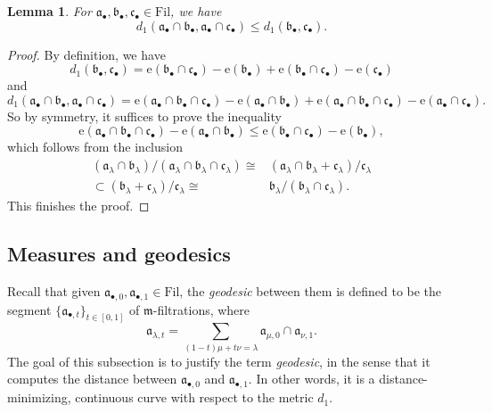 \documentclass[11pt, leqno]{amsart}%
\theoremstyle{plain}
\newtheorem{lemma}[theorem]{Lemma}
\theoremstyle{definition}
\theoremstyle{remark}
\newcommand{\fa}{\mathfrak{a}}
\newcommand{\fb}{\mathfrak{b}}
\newcommand{\fc}{\mathfrak{c}}
\newcommand{\fm}{\mathfrak{m}}
\newcommand{\e}{\mathrm{e}}
\newcommand{\Fil}{\mathrm{Fil}}
\numberwithin{equation}{section}
\begin{document}
\begin{lemma}\label{lem:rooftop}
    For $\fa_\bullet,\fb_\bullet,\fc_\bullet\in\Fil$, we have
    \begin{equation}\label{eqn:strong triangle}
        d_1(\fa_\bullet\cap \fb_\bullet,\fa_\bullet\cap\fc_\bullet)\le d_1(\fb_\bullet,\fc_\bullet).
    \end{equation}
\end{lemma}

\begin{proof}
    By definition, we have
    \[
        d_1(\fb_\bullet,\fc_\bullet)= \e(\fb_\bullet\cap \fc_\bullet)-\e(\fb_\bullet)+
        \e(\fb_\bullet\cap \fc_\bullet)-\e(\fc_\bullet)
    \]
    and
    \[
        d_1(\fa_\bullet\cap\fb_\bullet,
        \fa_\bullet\cap\fc_\bullet)=
        \e(\fa_\bullet\cap\fb_\bullet\cap \fc_\bullet)-\e(\fa_\bullet\cap\fb_\bullet)+\e(\fa_\bullet\cap\fb_\bullet\cap \fc_\bullet)-\e(\fa_\bullet\cap\fc_\bullet).
    \]
    So by symmetry, it suffices to prove the inequality
    \[
        \e(\fa_\bullet\cap\fb_\bullet\cap \fc_\bullet)-\e(\fa_\bullet\cap\fb_\bullet)\le\e(\fb_\bullet\cap \fc_\bullet)-\e(\fb_\bullet),
    \]
    which follows from the inclusion 
    \begin{align*}
        (\fa_\lambda\cap\fb_\lambda)/
        (\fa_\lambda\cap\fb_\lambda\cap \fc_\lambda)\cong 
        &(\fa_\lambda\cap\fb_\lambda+
        \fc_\lambda)/\fc_\lambda\\
        \subset (\fb_\lambda+\fc_\lambda)/\fc_\lambda\cong &\fb_\lambda/(\fb_\lambda\cap\fc_\lambda).	
    \end{align*}	
    This finishes the proof. 
\end{proof}













\subsection{Measures and geodesics}\label{ssec:geodesic}

Recall that given $\fa_{\bullet,0},\fa_{\bullet,1}\in\Fil$, the \emph{geodesic} between them is defined to be the segment $\{\fa_{\bullet,t}\}_{t\in[0,1]}$ of $\fm$-filtrations, where
\[
    \fa_{\lambda,t}=\sum_{(1-t)\mu+t\nu=\lambda} \fa_{\mu,0}\cap\fa_{\nu,1}.
\]
The goal of this subsection is to justify the term \emph{geodesic}, in the sense that it computes the distance between $\fa_{\bullet,0}$ and $\fa_{\bullet,1}$. In other words, it is a distance-minimizing, continuous curve with respect to the metric $d_1$.
\end{document}
